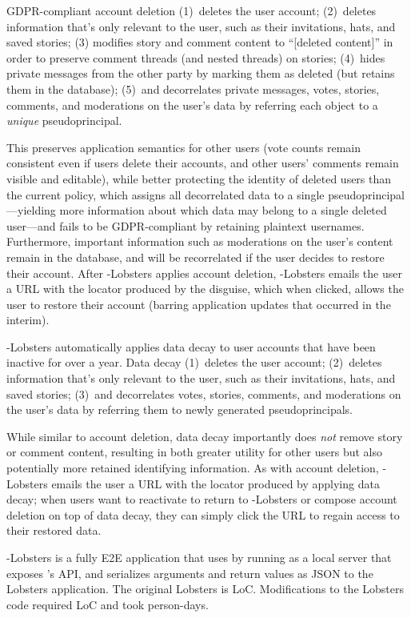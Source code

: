 GDPR-compliant account deletion
%
(1)~deletes the user account;
%
(2)~deletes information that's only relevant to the user, such as their invitations, hats, and saved
stories;
%
(3) modifies story and comment content to ``[deleted content]'' in order to preserve comment threads
(and nested threads) on stories;
%
(4)~hides private messages from the other party by marking them as deleted (but retains them in the
database);
%
(5)~and decorrelates private messages, votes, stories, comments, and moderations on the user's data
by referring each object to a \emph{unique} pseudoprincipal.
%

This preserves application semantics for other users (\eg vote counts remain consistent even if
users delete their accounts, and other users' comments remain visible and editable), while better
protecting the identity of deleted users than the current policy, which assigns all decorrelated
data to a single pseudoprincipal---yielding more information about which data may belong to a single
deleted user---and fails to be GDPR-compliant by retaining plaintext usernames. Furthermore,
important information such as moderations on the user's content remain in the database, and will be
recorrelated if the user decides to restore their account.  After \sys-Lobsters applies account
deletion, \sys-Lobsters emails the user a URL with the locator produced by the disguise, which when
clicked, allows the user to restore their account (barring application updates that occurred in the
interim).

\sys-Lobsters automatically applies data decay to user accounts that have been inactive for over a year.
Data decay
%
(1)~deletes the user account;
%
(2)~deletes information that's only relevant to the user, such as their invitations, hats, and saved
stories;
%
(3)~and decorrelates votes, stories, comments, and moderations on the user's data by referring them
to newly generated pseudoprincipals.
%

While similar to account deletion, data decay importantly does \emph{not} remove story or comment
content, resulting in both greater utility for other users but also potentially more retained
identifying information.  As with account deletion, \sys-Lobsters emails the user a URL with the locator
produced by applying data decay; when users want to reactivate to return to \sys-Lobsters or compose
account deletion on top of data decay, they can simply click the URL to regain access to their
restored data.

\sys-Lobsters is a fully E2E application that uses \sys by running \sys as a local
server that exposes \sys's API, and serializes arguments and return values as JSON to the Lobsters
application.
The original Lobsters is LoC.
Modifications to the Lobsters code required LoC and took  person-days.

